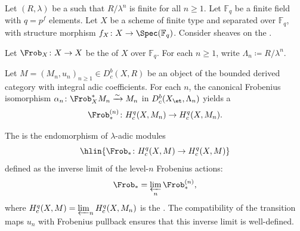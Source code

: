 \begin{definition} \label{definition:frobenius_action_on_compactly_supported_lambda_adic_cohomology_with_integral_coefficients}
    Let $(R, \lambda)$ be a   such that $R/\lambda^n$ is finite for all $n \geq 1$. Let $\mathbb{F}_q$ be a finite field with $q = p^f$ elements. Let $X$ be a scheme of finite type and separated over $\mathbb{F}_q$, with structure morphism $f_X \colon X \to \Spec(\mathbb{F}_q)$. Consider sheaves on the .

    Let $\Frob_X \colon X \to X$ be the  of $X$ over $\mathbb{F}_q$. For each $n \geq 1$, write $\Lambda_n \coloneqq R/\lambda^n$.

    Let $M = (M_n, u_n)_{n \geq 1} \in D_c^b(X, R)$ be an object of the bounded derived category with integral adic coefficients. For each $n$, the canonical Frobenius isomorphism $\alpha_n \colon \Frob_X^* M_n \xrightarrow{\sim} M_n$ in $D_c^b(X_{\et}, \Lambda_n)$ yields a 
    $$\Frob_*^{(n)} \colon H_c^q(X, M_n) \to H_c^q(X, M_n).$$

    The  is the endomorphism of $\lambda$-adic modules
    $$\hlin{\Frob_* \colon H_c^q(X, M) \to H_c^q(X, M)}$$
    defined as the inverse limit of the level-$n$ Frobenius actions:
    $$\Frob_* = \varprojlim_n \Frob_*^{(n)},$$
    where $H_c^q(X, M) = \varprojlim_n H_c^q(X, M_n)$ is the . The compatibility of the transition maps $u_n$ with Frobenius pullback ensures that this inverse limit is well-defined.
\end{definition}